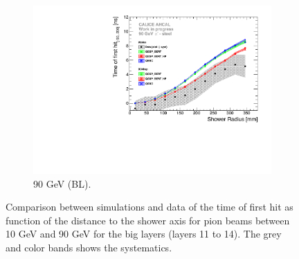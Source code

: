 \begin{figure}[htbp!]
\begin{subfigure}[t]{0.5\textwidth}
		\includegraphics[width=1\textwidth]{chap5/fig_AHCAL_timing/Pions/ComparisonToSim/Time_Radius_90GeV_BL.pdf}
		\caption{90 GeV (BL).} \label{fig:Radius_BL_SimData_90GeV}
	\end{subfigure}
	\caption{Comparison between simulations and data of the time of first hit as function of the distance to the shower axis for pion beams between 10 GeV and 90 GeV for the big layers (layers 11 to 14). The grey and color bands shows the systematics.}
	\label{fig:Radius_BL_SimData_Comparison}
\end{figure}

